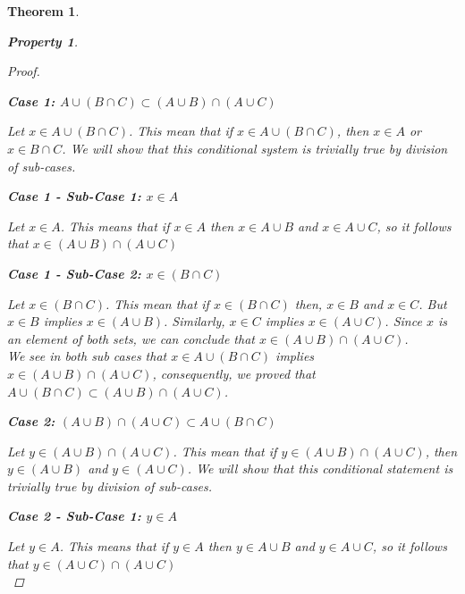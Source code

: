 \documentclass{book}
\newtheorem{theorem}{Theorem}[section]
\newtheorem{property}{Property}[theorem]
\theoremstyle{definition}
\theoremstyle{remark}
\begin{document}
\begin{theorem}
\begin{property}
\begin{proof}
            \begin{flushleft} \textbf{Case 1: $A \cup (B \cap C) \subset (A \cup B) \cap (A \cup C)$} \end{flushleft}
                Let $x \in A \cup (B \cap C)$. This mean that if $x \in A \cup (B \cap C)$, then $x \in A$ or $x \in B \cap C$. We will show that this conditional system is trivially true by division of sub-cases. \\
                
                    \begin{flushleft} \textbf{Case 1 - Sub-Case 1: $x \in A$} \end{flushleft}
                        Let $x \in A$. This means that if $x \in A$ then $x \in A \cup B$ and $x \in A \cup C$, so it follows that $x \in (A \cup B) \cap (A \cup C)$ \\
                    
                    \begin{flushleft} \textbf{Case 1 - Sub-Case 2: $x \in (B \cap C)$} \end{flushleft}  
                        Let $x \in (B \cap C)$. This mean that if $x \in (B \cap C)$ then, $x \in B$ and $x \in C$.  But $x \in B$ implies $x \in (A \cup B)$. Similarly, $x \in C$ implies $x \in (A \cup C)$. Since $x$ is an element of both sets, we can conclude that $x \in (A \cup B) \cap (A \cup C)$. \\
                
                We see in both sub cases that $x \in A \cup (B \cap C)$ implies $x \in (A \cup B) \cap (A \cup C)$, consequently, we proved that $A \cup (B \cap C) \subset (A \cup B) \cap (A \cup C)$. \\
                
            \begin{flushleft} \textbf{Case 2: $(A \cup B) \cap (A \cup C) \subset A \cup (B \cap C)$} \end{flushleft} 
                Let $y \in (A \cup B) \cap (A \cup C)$. This mean that if $y \in (A \cup B) \cap (A \cup C)$, then $y \in (A \cup B)$ and $y \in (A \cup C)$. We will show that this conditional statement is trivially true by division of sub-cases. \\
                
                    \begin{flushleft} \textbf{Case 2 - Sub-Case 1: $y \in A$} \end{flushleft}
                        Let $y \in A$. This means that if $y \in A$ then $y \in A \cup B$ and $y \in A \cup C$, so it follows that $y \in (A \cup C) \cap (A \cup C)$ \\
                    

\end{proof}
\end{property}
\end{theorem}
\end{document}
